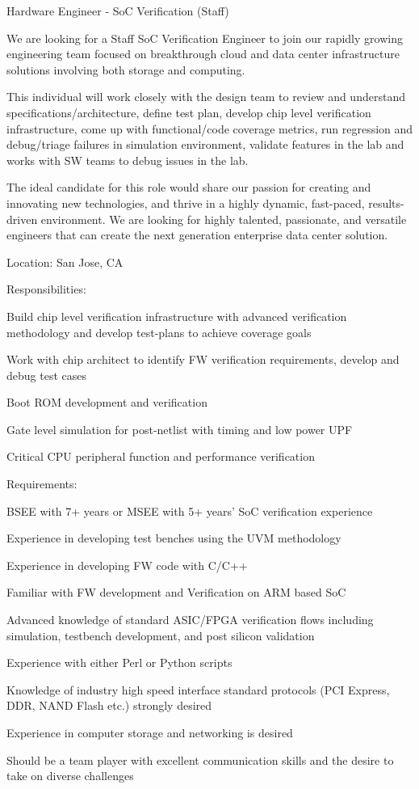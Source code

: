 \break

\par Hardware Engineer - SoC Verification (Staff)
\par We are looking for a Staff SoC Verification Engineer to join our rapidly growing engineering team focused on breakthrough cloud and data center infrastructure solutions involving both storage and computing.
\par This individual will work closely with the design team to review and understand specifications/architecture, define test plan, develop chip level verification infrastructure, come up with functional/code coverage metrics, run regression and debug/triage failures in simulation environment, validate features in the lab and works with SW teams to debug issues in the lab.
\par The ideal candidate for this role would share our passion for creating and innovating new technologies, and thrive in a highly dynamic, fast-paced, results-driven environment. We are looking for highly talented, passionate, and versatile engineers that can create the next generation enterprise data center solution.
\par Location: San Jose, CA
\par Responsibilities:
\par Build chip level verification infrastructure with advanced verification methodology and develop test-plans to achieve coverage goals
\par Work with chip architect to identify FW verification requirements, develop and debug test cases
\par Boot ROM development and verification
\par Gate level simulation for post-netlist with timing and low power UPF
\par Critical CPU peripheral function and performance verification
\par Requirements:
\par BSEE with 7+ years or MSEE with 5+ years’ SoC verification experience
\par Experience in developing test benches using the UVM methodology
\par Experience in developing FW code with C/C++
\par Familiar with FW development and Verification on ARM based SoC
\par Advanced knowledge of standard ASIC/FPGA verification flows including simulation, testbench development, and post silicon validation
\par Experience with either Perl or Python scripts
\par Knowledge of industry high speed interface standard protocols (PCI Express, DDR, NAND Flash etc.) strongly desired
\par Experience in computer storage and networking is desired
\par Should be a team player with excellent communication skills and the desire to take on diverse challenges

\bye
